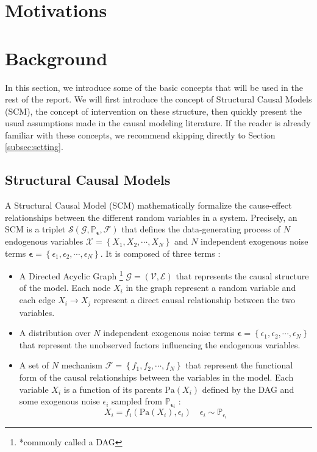 \documentclass{article}
\begin{document}
\section{Motivations}\label{subsec:intro}

\section{Background}\label{subsec:background}

In this section, we introduce some of the basic concepts that will be used in the rest of the report. We will first introduce the concept of Structural Causal Models (SCM), the concept of intervention on these structure, then quickly present the usual assumptions made in the causal modeling literature. If the reader is already familiar with these concepts, we recommend skipping directly to Section \ref{subsec:setting}.
\subsection{Structural Causal Models}

A Structural Causal Model (SCM) mathematically formalize the cause-effect relationships between the different random variables in a system. Precisely, an SCM is a triplet $\mathcal{S}(\mathcal{G},\mathbb{P}_{\boldsymbol{\epsilon}}, \mathcal{F})$ that defines the data-generating process of $N$ endogenous variables $\mathcal{X} = \left\{ X_1, X_2, \cdots, X_N \right\}$ and $N$ independent exogenous noise terms $\boldsymbol{\epsilon} = \left\{ \epsilon_1, \epsilon_2, \cdots, \epsilon_N \right\}$. It is composed of three terms :
\begin{itemize}
    \item A Directed Acyclic Graph \footnote{*commonly called a DAG} $\mathcal{G} = \left( \mathcal{V}, \mathcal{E} \right)$ that represents the causal structure of the model. Each node $X_i$ in the graph represent a random variable and each edge $X_i \rightarrow X_j$ represent a direct causal relationship between the two variables.
    \item A distribution over $N$ independent exogenous noise terms $\boldsymbol{\epsilon} = \left\{ \epsilon_1, \epsilon_2, \cdots, \epsilon_N \right\}$ that represent the unobserved factors influencing the endogenous variables.
    \item A set of $N$ mechanism $\mathcal{F} = \left\{ f_1, f_2, \cdots, f_N \right\}$ that represent the functional form of the causal relationships between the variables in the model. Each variable $X_i$ is a function of its parents $\text{Pa}(X_i)$ defined by the DAG and some exogenous noise $\epsilon_i$ sampled from $\mathbb{P}_{\boldsymbol{\epsilon_i}}$ :
    \begin{equation}
    X_i  = f_i(\text{Pa}(X_i), \epsilon_i)  \quad \epsilon_i \sim \mathbb{P}_{\epsilon_i}
    \end{equation}
\end{itemize}
\end{document}
